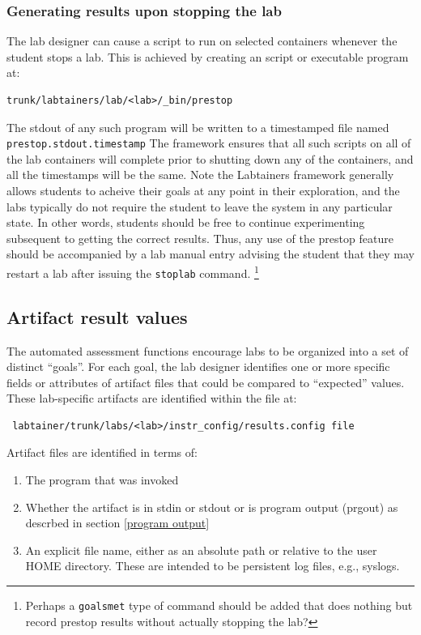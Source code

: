 \documentclass[12pt]{article}
\begin{document}
\subsubsection{Generating results upon stopping the lab}
The lab designer can cause a script to run on selected containers whenever the student stops a lab.
This is achieved by creating an script or executable program at:
\begin{verbatim}
trunk/labtainers/lab/<lab>/_bin/prestop
\end{verbatim}
The stdout of any such program will be written to a timestamped file named {\tt prestop.stdout.timestamp}
The framework ensures that all such scripts on all of the lab containers will complete prior to
shutting down any of the containers, and all the timestamps
will be the same.  Note the Labtainers framework generally allows students to acheive their goals at any
point in their exploration, and the labs typically do not require the student to leave the system in any
particular state.  In other words, students should be free to continue experimenting subsequent to getting
the correct results.  Thus, any use of the prestop feature should be accompanied by a lab manual entry
advising the student that they may restart a lab after issuing the {\tt stoplab} command. \footnote{Perhaps a
{\tt goalsmet} type of command should be added that does nothing but record prestop results without actually
stopping the lab?}

\subsection{Artifact result values}
\label{results.config}
The automated assessment functions encourage labs to be organized into a set of distinct ``goals''.
For each goal, the lab designer identifies one or more specific fields or attributes of artifact files that
could be compared to ``expected'' values.  These lab-specific artifacts are identified within the
file at:
\begin{verbatim}
 labtainer/trunk/labs/<lab>/instr_config/results.config file
\end{verbatim}
\noindent Artifact files are identified in terms of:
\begin{enumerate}
\item The program that was invoked
\item Whether the artifact is in stdin or stdout or is program output (prgout) as descrbed in section \ref{program output}
\item An explicit file name, either as an absolute path or relative to the user HOME directory.  These are intended
to be persistent log files, e.g., syslogs.
\end{enumerate}
\end{document}
